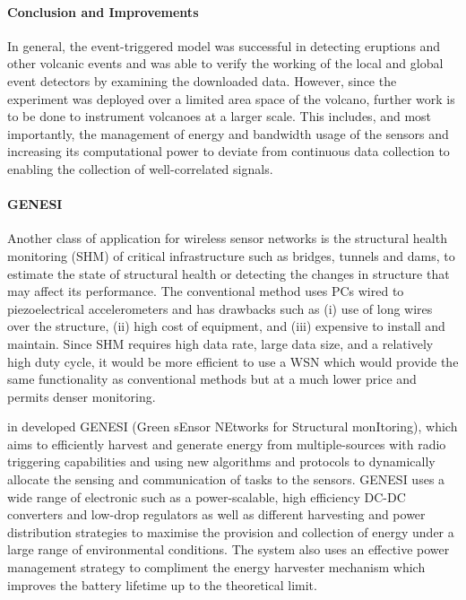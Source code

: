 \paragraph{Conclusion and Improvements}

In general, the event-triggered model was successful in detecting eruptions and other volcanic events and was able to verify the working of the local and global event detectors by examining the downloaded data. However, since the experiment was deployed over a limited area space of the volcano, further work is to be done to instrument volcanoes at a larger scale. This includes, and most importantly, the management of energy and bandwidth usage of the sensors and increasing its computational power to deviate from continuous data collection to enabling the collection of well-correlated signals. 



\paragraph{GENESI} Another class of application for wireless sensor networks is the structural health monitoring (SHM) of critical infrastructure such as bridges, tunnels and dams, to estimate the state of structural health or detecting the changes in structure that may affect its performance. The conventional method uses PCs wired to piezoelectrical accelerometers and has drawbacks such as (i) use of long wires over the structure, (ii) high cost of equipment, and (iii) expensive to install and maintain. Since SHM requires high data rate, large data size, and a relatively high duty cycle, it would be more efficient to use a WSN which would provide the same functionality as conventional methods but at a much lower price and permits denser monitoring.

\citeauthor{5508230} in \cite{5508230} developed GENESI (Green sEnsor NEtworks for Structural monItoring), which aims to efficiently harvest and generate energy from multiple-sources with radio triggering capabilities and using new algorithms and protocols to dynamically allocate the sensing and communication of tasks to the sensors. GENESI uses a wide range of electronic such as a power-scalable, high efficiency  DC-DC converters and low-drop regulators as well as different harvesting and power distribution strategies to maximise the provision and collection of energy under a large range of environmental conditions. The system also uses an effective power management strategy to compliment the energy harvester mechanism which improves the battery lifetime up to the theoretical limit.

